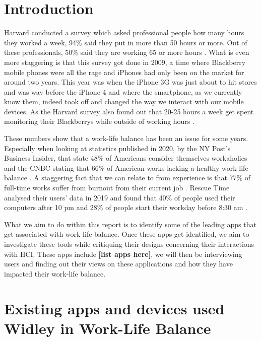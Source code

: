 \documentclass{sigchi}
\begin{document}
\section{Introduction}
	Harvard conducted a survey which asked professional people how many hours they worked a week, 94\% said they put in more than 50 hours or more. Out of these professionals, 50\% said they are working 65 or more hours \cite{harvard_review}. What is even more staggering is that this survey got done in 2009, a time where Blackberry mobile phones were all the rage and iPhones had only been on the market for around two years. This year was when the iPhone 3G was just about to hit stores and was way before the iPhone 4 and where the smartphone, as we currently know them, indeed took off and changed the way we interact with our mobile devices. As the Harvard survey also found out that 20-25 hours a week get spent monitoring their Blackberrys while outside of working hours \cite{harvard_review}. 
	
	
	These numbers show that a work-life balance has been an issue for some years. Especially when looking at statistics published in 2020, by the NY Post's Business Insider, that state 48\% of Americans consider themselves workaholics and the CNBC stating that 66\% of American works lacking a healthy work-life balance \cite{work-life_2020}. A staggering fact that we can relate to from experience is that 77\% of full-time works suffer from burnout from their current job \cite{work-life_2020}. Rescue Time analysed their users' data in 2019 and found that 40\% of people used their computers after 10 pm and 28\% of people start their workday before 8:30 am \cite{rescuetime_study}.  
	
	What we aim to do within this report is to identify some of the leading apps that get associated with work-life balance. Once these apps get identified, we aim to investigate these tools while critiquing their designs concerning their interactions with HCI. These apps include \textbf{[list apps here]}, we will then be interviewing users and finding out their views on these applications and how they have impacted their work-life balance.
	
	  

\section{Existing apps and devices used Widley in Work-Life Balance}
	
\end{document}
